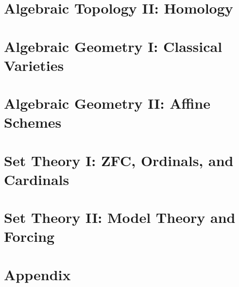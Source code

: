\documentclass[11pt,a5paper,twoside=semi,openright,numbers=noenddot,titlepage=false]{scrbook}
\begin{document}
\part{Algebraic Topology II: Homology}
\label{part:algtop2}
\parttoc






\part{Algebraic Geometry I: Classical Varieties}
\label{part:ag1}
\parttoc





\part{Algebraic Geometry II: Affine Schemes}
\label{part:ag2}
\parttoc







\part{Set Theory I: ZFC, Ordinals, and Cardinals}
\label{part:st1}
\parttoc





\part{Set Theory II: Model Theory and Forcing}
\label{part:st2}
\parttoc




\part{Appendix}
\parttoc
\appendix







\backmatter

\clearpage
\printbibliography[type=image,title={Image Attributions}]
\printbibliography[nottype=image]
\end{document}
